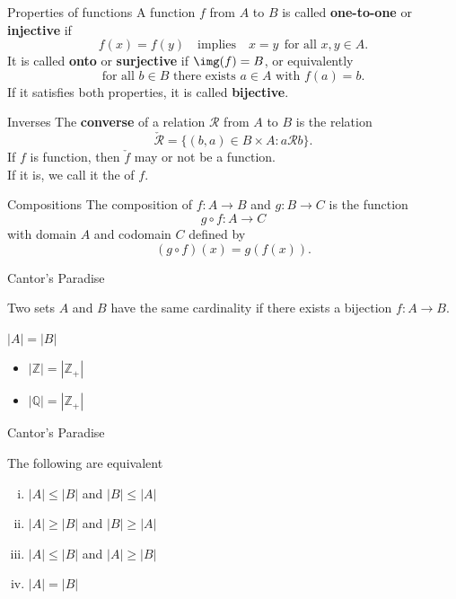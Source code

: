\documentclass{beamer}
\begin{document}
\begin{frame}{Properties of functions}
A function $f$ from $A$ to $B$ is called \textbf{one-to-one} or \textbf{injective} if 
\pause
$$f(x) = f(y) \quad\text{implies}\quad x=y\ \ \text{for all $x,y\in A$}.$$
\pause
It is called \textbf{onto} or \textbf{surjective} if $\img(f) = B$, or equivalently
$$\text{for all $b\in B$ there exists $a\in A$ with $f(a) =b$}.$$
\pause
If it satisfies both properties, it is called \textbf{bijective}.
\end{frame}

\begin{frame}{Inverses}
The \textbf{converse} of a relation $\mathcal R$ from $A$ to $B$ is the relation
\pause
$$\check{\mathcal R} = \{(b,a)\in B\times A: a\mathcal R b\}.$$
\pause
If $f$ is  function, then $\check f$ may or not be a function.\\
\pause
If it is, we call it the  of $f$.
\end{frame}

\begin{frame}{Compositions}
The composition of $f: A\rightarrow B$ and $g: B\rightarrow C$ is the function
\pause
$$g\circ f: A\rightarrow C$$
\pause
with domain $A$ and codomain $C$ defined by
\pause
$$(g\circ f)(x)  = g(f(x)).$$
\end{frame}

\begin{frame}{Cantor's Paradise}
\begin{defn}
Two sets $A$ and $B$ have the same cardinality if there exists a bijection $f: A\rightarrow B$.
\end{defn}
  $|A| = |B|$
\begin{itemize}
\item $|\mathbb Z| = |\mathbb Z_+|$
\item $|\mathbb Q| = |\mathbb Z_+|$
\end{itemize}
\end{frame}

\begin{frame}{Cantor's Paradise}
\begin{thm}
The following are equivalent
\begin{enumerate}[(i)]
\item $|A|\leq |B|$  and $|B|\leq |A|$
\item $|A|\geq |B|$  and $|B|\geq |A|$
\item $|A|\leq |B|$  and $|A|\geq |B|$
\item $|A|= |B|$
\end{enumerate}
\end{thm}
\end{frame}
\end{document}
